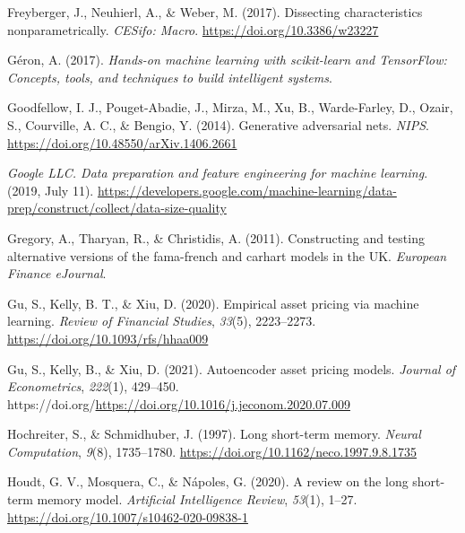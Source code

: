 \documentclass[12pt]{article}
\newlength{\cslhangindent}
\newlength{\cslentryspacingunit} %
\newenvironment{CSLReferences}[2] %
 {%
  \setlength{\parindent}{0pt}
  \ifodd #1
  \let\oldpar\par
  \def\par{\hangindent=\cslhangindent\oldpar}
  \fi
  \setlength{\parskip}{#2\cslentryspacingunit}
 }%
 {}
\begin{document}
\begin{CSLReferences}{1}{0}
\leavevmode{}%
Freyberger, J., Neuhierl, A., \& Weber, M. (2017). Dissecting characteristics nonparametrically. \emph{{CESifo}: Macro}. \url{https://doi.org/10.3386/w23227}

\leavevmode{}%
Géron, A. (2017). \emph{Hands-on machine learning with scikit-learn and {TensorFlow}: Concepts, tools, and techniques to build intelligent systems}.

\leavevmode{}%
Goodfellow, I. J., Pouget-Abadie, J., Mirza, M., Xu, B., Warde-Farley, D., Ozair, S., Courville, A. C., \& Bengio, Y. (2014). Generative adversarial nets. \emph{{NIPS}}. \url{https://doi.org/10.48550/arXiv.1406.2661}

\leavevmode{}%
\emph{Google {LLC}. Data preparation and feature engineering for machine learning}. (2019, July 11). \url{https://developers.google.com/machine-learning/data-prep/construct/collect/data-size-quality}

\leavevmode{}%
Gregory, A., Tharyan, R., \& Christidis, A. (2011). Constructing and testing alternative versions of the fama-french and carhart models in the {UK}. \emph{European Finance {eJournal}}.

\leavevmode{}%
Gu, S., Kelly, B. T., \& Xiu, D. (2020). Empirical asset pricing via machine learning. \emph{Review of Financial Studies}, \emph{33}(5), 2223--2273. \url{https://doi.org/10.1093/rfs/hhaa009}

\leavevmode{}%
Gu, S., Kelly, B., \& Xiu, D. (2021). Autoencoder asset pricing models. \emph{Journal of Econometrics}, \emph{222}(1), 429--450. https://doi.org/\url{https://doi.org/10.1016/j.jeconom.2020.07.009}

\leavevmode{}%
Hochreiter, S., \& Schmidhuber, J. (1997). Long short-term memory. \emph{Neural Computation}, \emph{9}(8), 1735--1780. \url{https://doi.org/10.1162/neco.1997.9.8.1735}

\leavevmode{}%
Houdt, G. V., Mosquera, C., \& Nápoles, G. (2020). A review on the long short-term memory model. \emph{Artificial Intelligence Review}, \emph{53}(1), 1--27. \url{https://doi.org/10.1007/s10462-020-09838-1}


\end{CSLReferences}
\end{document}
